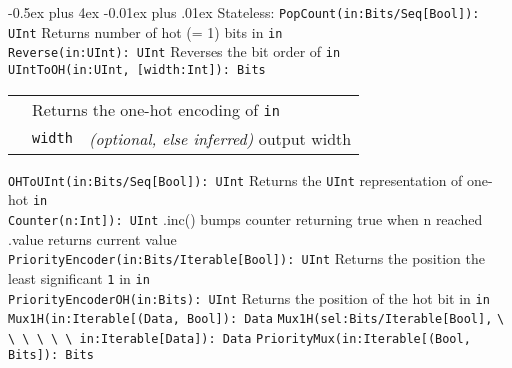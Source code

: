 \documentclass[10pt,landscape]{article}
\makeatletter
\renewcommand{\subsection}{\@startsection{subsection}{2}{0mm}%
                                {-0.5ex plus 4ex}%
                                {-0.01ex plus .01ex}%
                                {\normalfont\normalsize\bfseries}}
\makeatother
\begin{document}
\begin{multicols}{3}
{    \subsection{Stateless}: \newline
        \lstinline|PopCount(in:Bits/Seq[Bool]): UInt| \newline
        \phantom{x} Returns number of hot (= 1) bits in \lstinline|in|\\
        \lstinline|Reverse(in:UInt): UInt| \newline
        \phantom{x} Reverses the bit order of \lstinline|in|\\
        \lstinline|UIntToOH(in:UInt, [width:Int]): Bits| \newline
        \begin{tabular}{l l l}
            & \multicolumn{2}{l}{Returns the one-hot encoding of \texttt{in}} \\
            & \lstinline|width| & {\em(optional, else inferred)} output width \\
        \end{tabular}
        \lstinline|OHToUInt(in:Bits/Seq[Bool]): UInt| \newline
        \phantom{x} Returns the \lstinline|UInt| representation of one-hot \lstinline|in|\\
        \lstinline|Counter(n:Int]): UInt| \newline
        \phantom{x} .inc() bumps counter returning true when n reached \newline
        \phantom{x} .value returns current value\\
        \lstinline|PriorityEncoder(in:Bits/Iterable[Bool]): UInt| \newline
        \phantom{x} Returns the position the least significant \lstinline|1| in \lstinline|in|\\
        \lstinline|PriorityEncoderOH(in:Bits): UInt| \newline
        \phantom{x} Returns the position of the hot bit in \lstinline|in|\\
        \lstinline|Mux1H(in:Iterable[(Data, Bool]): Data| \newline
        \lstinline|Mux1H(sel:Bits/Iterable[Bool],| \newline
        \lstinline|\ \ \ \ \ \ in:Iterable[Data]): Data| \newline
        \lstinline|PriorityMux(in:Iterable[(Bool, Bits]): Bits| \newline
}
\end{multicols}
\end{document}
